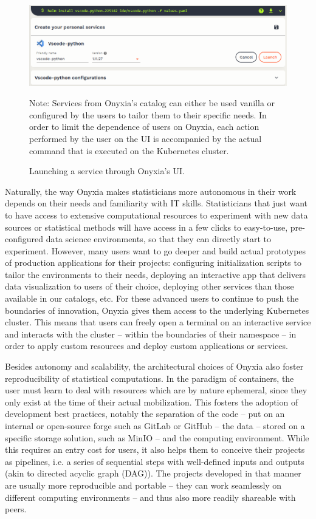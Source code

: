 \documentclass[graybox]{svmult}
\begin{document}
\begin{figure}[htbp]
    \includegraphics[width=\linewidth]{figures/service-configuration.png}
    \caption{Launching a service through Onyxia's UI.}
    \label{fig:service-configuration}
    \medskip
    {\footnotesize Note: Services from Onyxia's catalog can either be used vanilla or configured by the users to tailor them to their specific needs. In order to limit the dependence of users on Onyxia, each action performed by the user on the UI is accompanied by the actual command that is executed on the Kubernetes cluster.}
\end{figure}

Naturally, the way Onyxia makes statisticians more autonomous in their work depends on their needs and familiarity with IT skills. Statisticians that just want to have access to extensive computational resources to experiment with new data sources or statistical methods will have access in a few clicks to easy-to-use, pre-configured data science environments, so that they can directly start to experiment. However, many users want to go deeper and build actual prototypes of production applications for their projects: configuring initialization scripts to tailor the environments to their needs, deploying an interactive app that delivers data visualization to users of their choice, deploying other services than those available in our catalogs, etc. For these advanced users to continue to push the boundaries of innovation, Onyxia gives them access to the underlying Kubernetes cluster. This means that users can freely open a terminal on an interactive service and interacts with the cluster -- within the boundaries of their namespace -- in order to apply custom resources and deploy custom applications or services.

Besides autonomy and scalability, the architectural choices of Onyxia also foster reproducibility of statistical computations. In the paradigm of containers, the user must learn to deal with resources which are by nature ephemeral, since they only exist at the time of their actual mobilization. This fosters the adoption of development best practices, notably the separation of the code -- put on an internal or open-source forge such as GitLab or GitHub -- the data -- stored on a specific storage solution, such as MinIO -- and the computing environment. While this requires an entry cost for users, it also helps them to conceive their projects as pipelines, i.e. a series of sequential steps with well-defined inputs and outputs (akin to directed acyclic graph (DAG)). The projects developed in that manner are usually more reproducible and portable -- they can work seamlessly on different computing environments -- and thus also more readily shareable with peers.
\end{document}
